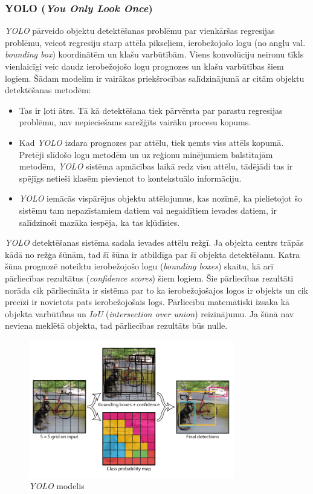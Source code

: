 \subsubsection{YOLO (\textit{You Only Look Once})}
\textit{YOLO} pārveido objektu detektēšanas problēmu par vienkāršas regresijas problēmu, veicot regresiju starp attēla pikseļiem, ierobežojošo logu (no angļu val. \textit{bounding box}) koordinātēm un klašu varbūtībām. Viens konvolūciju neironu tīkls vienlaicīgi veic daudz ierobežojošo logu prognozes un klašu varbūtības šiem logiem. Šādam modelim ir vairākas priekšrocības salīdzinājumā ar citām objektu detektēšanas metodēm: 
\begin{itemize}
	\item Tas ir ļoti ātrs. Tā kā detektēšana tiek pārvērsta par parastu regresijas problēmu, nav nepieciešams sarežģīts vairāku procesu kopums. 
	\item Kad \textit{YOLO} izdara prognozes par attēlu, tiek ņemts viss attēls kopumā. Pretēji slīdošo logu metodēm un uz reģionu minējumiem balstītajām metodēm, \textit{YOLO} sistēma apmācības laikā redz visu attēlu, tādējādi tas ir spējīgs netieši klasēm pievienot to kontekstuālo informāciju.
	\item \textit{YOLO} iemācās vispārējus objektu attēlojumus, kas nozīmē, ka pielietojot šo sistēmu tam nepazīstamiem datiem vai negaidītiem ievades datiem, ir salīdzinoši mazāka iespēja, ka tas kļūdīsies. 
\end{itemize}

\textit{YOLO} detektēšanas sistēma sadala ievades attēlu režģī. Ja objekta centrs trāpās kādā no režģa šūnām, tad šī šūna ir atbildīga par šī objekta detektēšanu. Katra šūna prognozē noteiktu ierobežojošo logu (\textit{bounding boxes}) skaitu, kā arī pārliecības rezultātus (\textit{confidence scores}) šiem logiem. Šie pārliecības rezultāti norāda cik pārliecināta ir sistēma par to ka ierobežojošajos logos ir objekts un cik precīzi ir novietots pats ierobežojošais logs. Pārliecību matemātiski izsaka kā objekta varbūtības un \textit{IoU} (\textit{intersection over union}) reizinājumu. Ja šūnā nav neviena meklētā objekta, tad pārliecības rezultāts būs nulle.

\begin{figure}[h]%
	\centering
	\includegraphics[height=6cm]{images/yolo.png} %
	\caption{\textit{YOLO} modelis \cite{redmon2016you}}%
	\label{fig:example}%
\end{figure}

